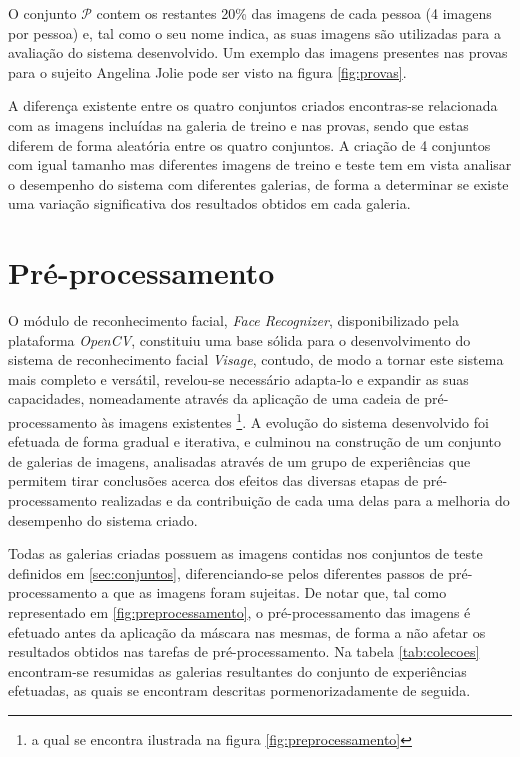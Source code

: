 O conjunto $\mathscr{P}$ contem os restantes 20\% das imagens de cada pessoa (4 imagens por pessoa) e, tal como o seu nome indica, as suas imagens são utilizadas para a avaliação do sistema desenvolvido. Um exemplo das imagens presentes nas provas para o sujeito Angelina Jolie pode ser visto na figura \ref{fig:provas}.

A diferença existente entre os quatro conjuntos criados encontras-se relacionada com as imagens incluídas na galeria de treino e nas provas, sendo que estas diferem de forma aleatória entre os quatro conjuntos. A criação de 4 conjuntos com igual tamanho mas diferentes imagens de treino e teste tem em vista analisar o desempenho do sistema com diferentes galerias, de forma a determinar se existe uma variação significativa dos resultados obtidos em cada galeria.

\section{Pré-processamento} \label{sec:experiencias}
O módulo de reconhecimento facial, \textit{Face Recognizer}, disponibilizado pela plataforma \textit{OpenCV}, constituiu uma base sólida para o desenvolvimento do sistema de reconhecimento facial \textit{Visage}, contudo, de modo a tornar este sistema mais completo e versátil, revelou-se necessário adapta-lo e expandir as suas capacidades, nomeadamente através da aplicação de uma cadeia de pré-processamento às imagens existentes \footnote{a qual se encontra ilustrada na figura \ref{fig:preprocessamento}}. A evolução do sistema desenvolvido foi efetuada de forma gradual e iterativa, e culminou na construção de um conjunto de galerias de imagens, analisadas através de um grupo de experiências que permitem tirar conclusões acerca dos efeitos das diversas etapas de pré-processamento realizadas e da contribuição de cada uma delas para a melhoria do desempenho do sistema criado. 

Todas as galerias criadas possuem as imagens contidas nos conjuntos de teste definidos em \ref{sec:conjuntos}, diferenciando-se pelos diferentes passos de pré-processamento a que as imagens foram sujeitas. De notar que, tal  como representado em \ref{fig:preprocessamento}, o pré-processamento das imagens é efetuado antes da aplicação da máscara nas mesmas, de forma a não afetar os resultados obtidos nas tarefas de pré-processamento. Na tabela \ref{tab:colecoes} encontram-se resumidas as galerias resultantes do conjunto de experiências efetuadas, as quais se encontram descritas pormenorizadamente de seguida.

